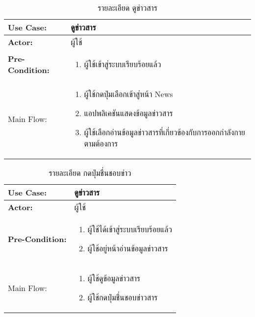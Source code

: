 \begin{table}
    \caption{รายละเอียด ดูข่าวสาร}
    \begin{tabularx}{\textwidth}{ | >{\centering\bf} p{3cm} | X |}
        \hline
        Use Case: & ดูข่าวสาร \\\hline
        Actor: & ผู้ใช้ \\\hline
        Pre-Condition: &
        \begin{enumerate}[table]
            \item ผู้ใช้เข้าสู่ระบบเรียบร้อยแล้ว
        \end{enumerate} \\\hline
        
        Main Flow: & 
        \begin{enumerate}[table]
            \item ผู้ใช้กดปุ่มเลือกเข้าสู่หน้า News
            \item แอปพลิเคชันแสดงข้อมูลข่าวสาร
            \item ผู้ใช้เลือกอ่านข้อมูลข่าวสารที่เกี่ยวข้องกับการออกกำลังกาย ตามต้องการ
        \end{enumerate}\\\hline
    \end{tabularx}
\end{table}


\begin{table}
    \caption{รายละเอียด กดปุ่มชื่นชอบข่าว}
    \begin{tabularx}{\textwidth}{ | >{\centering\bf} p{3cm} | X |}
        \hline
        Use Case: & ดูข่าวสาร \\\hline
        Actor: & ผู้ใช้ \\\hline
        Pre-Condition: &
        \begin{enumerate}[table]
            \item ผู้ใช้ได้เข้าสู่ระบบเรียบร้อยแล้ว
            \item ผู้ใช้อยู่หน้าอ่านข้อมูลข่าวสาร          
        \end{enumerate} \\\hline
        
        Main Flow: & 
        \begin{enumerate}[table]
            \item ผู้ใช้ดูข้อมูลข่าวสาร
            \item ผู้ใช้กดปุ่มชื่นชอบข่าวสาร      
        \end{enumerate}\\\hline
    \end{tabularx}
\end{table}


